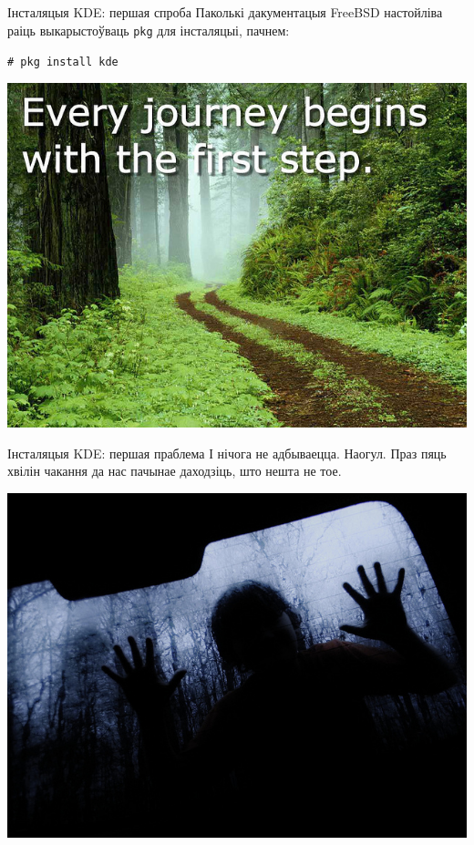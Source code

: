 \documentclass[ignorenonframetext,hyperref={pdftex,unicode}]{beamer}
\begin{document}
\begin{frame}{Інсталяцыя KDE: першая спроба} %
	Паколькі дакументацыя FreeBSD настойліва раіць выкарыстоўваць \texttt{pkg} для інсталяцыі, пачнем:

	\texttt{\# pkg install kde}
	\begin{center}
 		\includegraphics[height=0.7\textheight,keepaspectratio]{2656648042_0ced853512_z} %
	\end{center}
\end{frame} %

\begin{frame}{Інсталяцыя KDE: першая праблема} %
	І нічога не адбываецца. Наогул. Праз пяць хвілін чакання да нас пачынае даходзіць, што нешта не тое.
	\begin{center}
 		\includegraphics[height=0.7\textheight,keepaspectratio]{6428406857_0f97c985fd_z} %
	\end{center}
\end{frame} %
\end{document}

